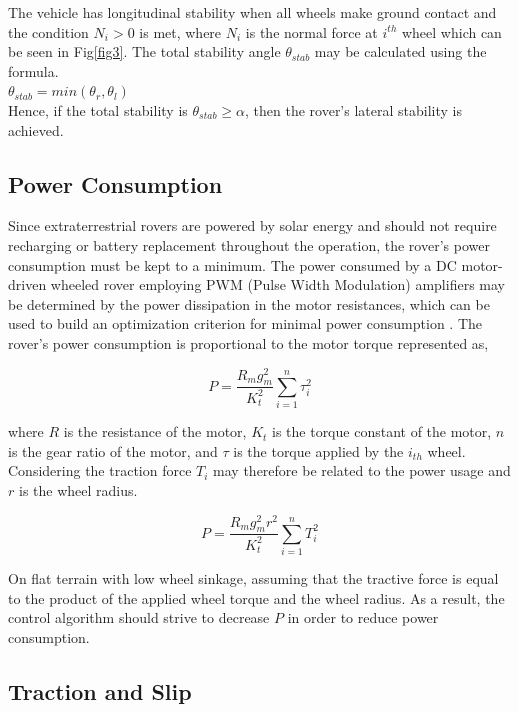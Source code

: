\documentclass[default,iicol]{sn-jnl}
\theoremstyle{thmstyleone}
\theoremstyle{thmstyletwo}
\theoremstyle{thmstylethree}
\begin{document}
The vehicle has longitudinal stability when all wheels make ground contact and the condition $N_i > 0$ is met, where $N_i$ is the normal force at $i^{th}$  wheel which can be seen in Fig\ref{fig3}. The total stability angle $\theta_{stab}$  may be calculated using the formula. \\
 $\theta_{stab} = min ( \theta_r,\theta_l)$\\    
Hence, if the total stability is $\theta_{stab} \geq \alpha$, then the rover's lateral stability is achieved.


\subsection{Power Consumption }\label{subsec2}

Since extraterrestrial rovers are powered by solar energy and should not require recharging or battery replacement throughout the operation, the rover's power consumption must be kept to a minimum. The power consumed by a DC motor-driven wheeled rover employing PWM (Pulse Width Modulation) amplifiers may be determined by the power dissipation in the motor resistances, which can be used to build an optimization criterion for minimal power consumption \cite{bib36}. The rover's power consumption is proportional to the motor torque represented as,


\begin{equation}
{P={\frac {{R}_{m}{{g}^{2}_{m}}} {{K}^{2}_{t}}}\sum^{n}_{i=1} {}}{{ {\tau }}^{2}_{i}}  
\end{equation}

where  $R$ is the resistance of the motor, $K_t$ is the torque constant of the motor, $n$ is the gear ratio of the motor, and $ \tau $ is the torque applied by the $i_{th}$ wheel. Considering \cite{bib6} the traction force $T_i$ may therefore be related to the power usage and $r$ is the wheel radius. 

\begin{equation}
{P={\frac {{R}_{m}{{g}^{2}_{m}{{r}^{2}}}} {{K}^{2}_{t}}}\sum^{n}_{i=1} }{{T}^{2}_{i}} 
\end{equation}

On flat terrain with low wheel sinkage, assuming that the tractive force is equal to the product of the applied wheel torque and the wheel radius. As a result, the control algorithm should strive to decrease $P$ in order to reduce power consumption.

\subsection{Traction and Slip }\label{subsec3}
\end{document}
